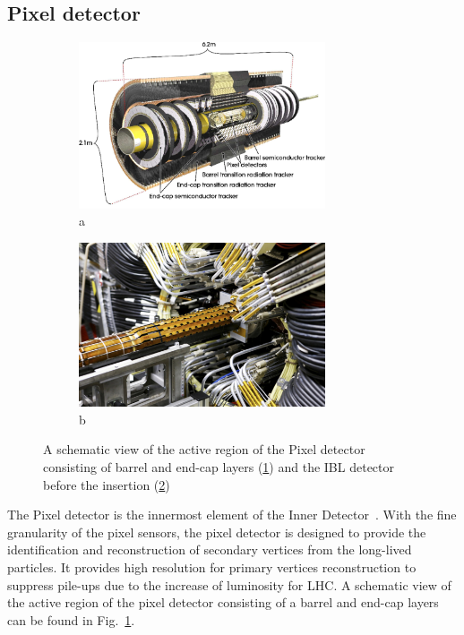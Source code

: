 \subsection{Pixel detector}
\label{sec:pixel}

\begin{figure}[htbp!]
\begin{subfigure}{.5\textwidth}
    \centering
    \includegraphics[width=0.8\textwidth]{chapters/c4/figures/pixel}
    \caption{a}
    \label{fig:pixel1}
\end{subfigure}%
\begin{subfigure}{.5\textwidth}
    \centering
    \includegraphics[width=0.8\textwidth]{chapters/c4/figures/IBL}
    \caption{b}
    \label{fig:pixel2}
\end{subfigure}
\caption{A schematic view of the active region of the Pixel detector consisting of barrel and end-cap layers (\ref{fig:pixel1}) and the IBL detector before the insertion (\ref{fig:pixel2})}
\label{fig:pixel}
\end{figure}

\par The Pixel detector is the innermost element of the Inner Detector~\cite{Hirono:2641635}. With the fine granularity of the pixel sensors, the pixel detector is designed to provide the identification and reconstruction of secondary vertices from the long-lived particles. It provides high resolution for primary vertices reconstruction to suppress pile-ups due to the increase of luminosity for LHC. A schematic view of the active region of the pixel detector consisting of a barrel and end-cap layers can be found in Fig.~\ref{fig:pixel1}.

